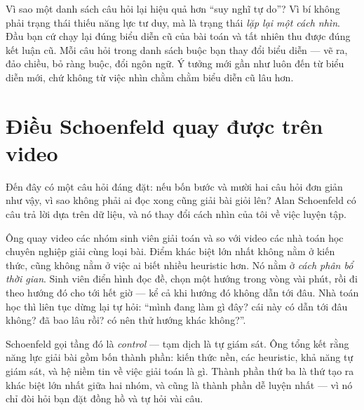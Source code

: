 \documentclass[../../algorithm.tex]{subfiles}
\begin{document}
\begin{trucgiac}
Vì sao một danh sách câu hỏi lại hiệu quả hơn ``suy nghĩ tự do''? Vì bí không phải trạng thái thiếu năng lực tư duy, mà là trạng thái \emph{lặp lại một cách nhìn}. Đầu bạn cứ chạy lại đúng biểu diễn cũ của bài toán và tất nhiên thu được đúng kết luận cũ. Mỗi câu hỏi trong danh sách buộc bạn thay đổi biểu diễn --- vẽ ra, đảo chiều, bỏ ràng buộc, đổi ngôn ngữ. Ý tưởng mới gần như luôn đến từ biểu diễn mới, chứ không từ việc nhìn chằm chằm biểu diễn cũ lâu hơn.
\end{trucgiac}

\section{Điều Schoenfeld quay được trên video}

Đến đây có một câu hỏi đáng đặt: nếu bốn bước và mười hai câu hỏi đơn giản như vậy, vì sao không phải ai đọc xong cũng giải bài giỏi lên? Alan Schoenfeld có câu trả lời dựa trên dữ liệu, và nó thay đổi cách nhìn của tôi về việc luyện tập.

Ông quay video các nhóm sinh viên giải toán và so với video các nhà toán học chuyên nghiệp giải cùng loại bài\cite{schoenfeld1985}. Điểm khác biệt lớn nhất không nằm ở kiến thức, cũng không nằm ở việc ai biết nhiều heuristic hơn. Nó nằm ở \emph{cách phân bổ thời gian}. Sinh viên điển hình đọc đề, chọn một hướng trong vòng vài phút, rồi đi theo hướng đó cho tới hết giờ --- kể cả khi hướng đó không dẫn tới đâu. Nhà toán học thì liên tục dừng lại tự hỏi: ``mình đang làm gì đây? cái này có dẫn tới đâu không? đã bao lâu rồi? có nên thử hướng khác không?''.

Schoenfeld gọi tầng đó là \emph{control} --- tạm dịch là tự giám sát. Ông tổng kết rằng năng lực giải bài gồm bốn thành phần: kiến thức nền, các heuristic, khả năng tự giám sát, và hệ niềm tin về việc giải toán là gì. Thành phần thứ ba là thứ tạo ra khác biệt lớn nhất giữa hai nhóm, và cũng là thành phần dễ luyện nhất --- vì nó chỉ đòi hỏi bạn đặt đồng hồ và tự hỏi vài câu.
\end{document}
